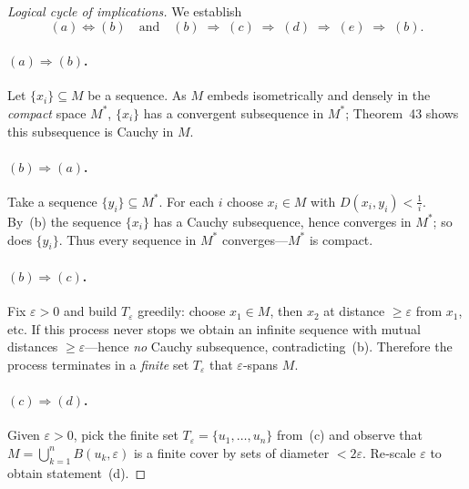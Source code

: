 \documentclass[12pt]{article}
\theoremstyle{definition} %
\theoremstyle{plain} %
\begin{document}
\begin{proof}[Logical cycle of implications]
  We establish
  \[
      (a)\Longleftrightarrow(b)\quad\text{and}\quad
      (b)\;\Longrightarrow\;(c)\;\Longrightarrow\;(d)\;\Longrightarrow\;(e)\;\Longrightarrow\;(b).
  \]

  \paragraph{\textbf{$(a)\Longrightarrow(b)$}.}
      Let $\{x_i\}\subseteq M$ be a sequence.
      As $M$ embeds isometrically and densely in the \emph{compact}
      space $M^{\!*}$, $\{x_i\}$ has a convergent subsequence in
      $M^{\!*}$; Theorem 43 shows this subsequence is Cauchy in $M$.

  \paragraph{\textbf{$(b)\Longrightarrow(a)$}.}
      Take a sequence $\{y_i\}\subseteq M^{\!*}$.
      For each $i$ choose $x_i\in M$ with $D(x_i,y_i)<\tfrac1i$.
      By~(b) the sequence $\{x_i\}$ has a Cauchy subsequence,
      hence converges in $M^{\!*}$; so does $\{y_i\}$.
      Thus every sequence in $M^{\!*}$ converges—$M^{\!*}$ is compact.

  \paragraph{\textbf{$(b)\Longrightarrow(c)$}.}
      Fix $\varepsilon>0$ and build $T_\varepsilon$ greedily:
      choose $x_1\in M$, then $x_2$ at distance $\ge\varepsilon$ from
      $x_1$, etc.
      If this process never stops we obtain an infinite sequence with
      mutual distances $\ge\varepsilon$—hence \emph{no} Cauchy
      subsequence, contradicting~(b).
      Therefore the process terminates in a \emph{finite} set $T_\varepsilon$
      that $\varepsilon$‑spans $M$.

  \paragraph{\textbf{$(c)\Longrightarrow(d)$}.}
      Given $\varepsilon>0$, pick the finite set
      $T_\varepsilon=\{u_1,\dots,u_n\}$ from~(c) and observe that
      \(
          M=\bigcup_{k=1}^{n}B(u_k,\varepsilon)
      \)
      is a finite cover by sets of diameter $<2\varepsilon$.
      Re‑scale $\varepsilon$ to obtain statement (d).


\end{proof}
\end{document}
